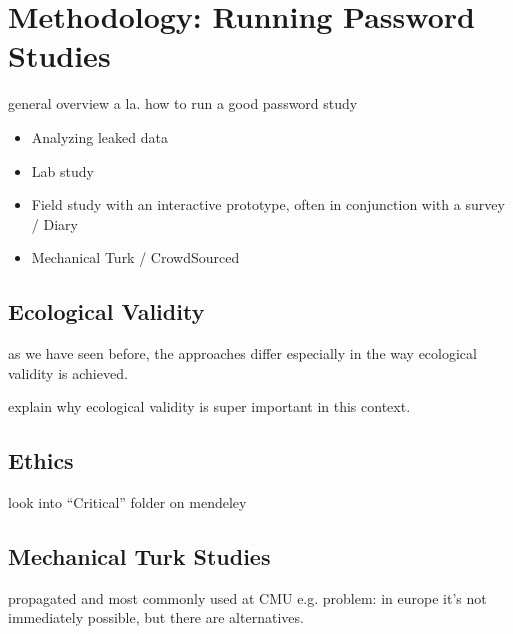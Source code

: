 \section{Methodology: Running Password Studies}

general overview a la. how to run a good password study 

\cite{Krol2016ExperimentDesign,Peer2017,Consolvo2003,Ross2010,Sotirakopoulos2011,Oppenheimer2009InstructionalManipulationChecks,Harbach2016HardLockLife,Barbera2013,Carreras2013,Chamberlain2012ResearchInTheWild,Henze2013EmpiricalResearchUbiquitous,Kuhn1993,VonZezschwitz2013SurvivalShortest,Hassenzahl2003,Mazurek2013Measuring,Egelman2015a,Rosoff2014,Savage2012}

\begin{itemize}
	\item Analyzing leaked data
	\item Lab study \cite{Sotirakopoulos2011}
	\item Field study with an interactive prototype, often in conjunction with a survey / Diary 
	\item Mechanical Turk / CrowdSourced
\end{itemize}




	\subsection{Ecological Validity}
 as we have seen before, the approaches differ especially in the way ecological validity is achieved.
 
 explain why ecological validity is super important in this context.
	

	\subsection{Ethics}
	look into ``Critical'' folder on mendeley
	

	\subsection{Mechanical Turk Studies}
	
	propagated and most commonly used at CMU e.g. \cite{Mazurek2013Measuring} \cite{Shay2014CanLongPasswordsBeSecureAndUsable} \cite{Shay2016DesigningPasswordPolicies}
	\cite{Shay2015UsablePoliciesMTurk}
	\cite{Ur2016PerceptionsPassword} \cite{Melicher2016UsabilityMobileTextPasswords} \cite{Ur2017DataDrivenPWMeter}
	problem: in europe it's not immediately possible, but there are alternatives. 



